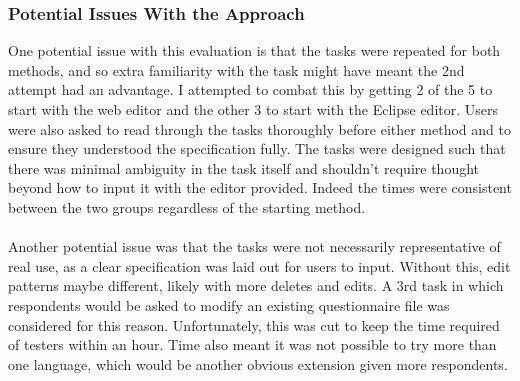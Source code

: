 \documentclass{article}
\begin{document}
{%

% 




\subsubsection{Potential Issues With the Approach}
One potential issue with this evaluation is that the tasks were repeated for both methods, and so extra familiarity with the task might have meant the 2nd attempt had an advantage. I attempted to combat this by getting 2 of the 5 to start with the web editor and the other 3 to start with the Eclipse editor. Users were also asked to read through the tasks thoroughly before either method and to ensure they understood the specification fully. The tasks were designed such that there was minimal ambiguity in the task itself and shouldn't require thought beyond how to input it with the editor provided. Indeed the times were consistent between the two groups regardless of the starting method.
\\
\\
Another potential issue was that the tasks were not necessarily representative of real use, as a clear specification was laid out for users to input. Without this, edit patterns maybe different, likely with more deletes and edits. A 3rd task in which respondents would be asked to modify an existing questionnaire file was considered for this reason. Unfortunately, this was cut to keep the time required of testers within an hour. Time also meant it was not possible to try more than one language, which would be another obvious extension given more respondents.
}
\end{document}
